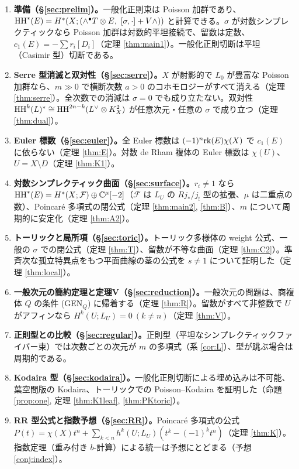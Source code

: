 \begin{enumerate}
\item[(1)] \textbf{準備（\S\ref{sec:prelim}）。}一般化正則束は Poisson 加群であり、$\HH^*(E)=H^*(X;(\wedge^\bullet T\otimes E,\ [\sigma,\cdot]+V\wedge))$ と計算できる。$\sigma$ が対数シンプレクティックなら Poisson 加群は対数的平坦接続で、留数は定数、$c_1(E)=-\sum r_i[D_i]$（定理 \ref{thm:main1}）。一般化正則切断は平坦（Casimir 型）切断である。
\item[(2)] \textbf{Serre 型消滅と双対性（\S\ref{sec:serre}）。}$X$ が射影的で $L_0$ が豊富な Poisson 加群なら、$m\gg0$ で横断次数 $a>0$ のコホモロジーがすべて消える（定理 \ref{thm:serre}）。全次数での消滅は $\sigma=0$ でも成り立たない。双対性 $\mathrm{HH}^k(L)^*\cong\mathrm{HH}^{2n-k}(L^\vee\otimes K_X^2)$ が任意次元・任意の $\sigma$ で成り立つ（定理 \ref{thm:dual}）。
\item[(3)] \textbf{Euler 標数（\S\ref{sec:euler}）。}全 Euler 標数は $(-1)^n\mathrm{rk}(E)\chi(X)$ で $c_1(E)$ に依らない（定理 \ref{thm:E}）。対数 de Rham 複体の Euler 標数は $\chi(U)$、$U=X\setminus D$（定理 \ref{thm:K1}）。
\item[(4)] \textbf{対数シンプレクティック曲面（\S\ref{sec:surface}）。}$r_i\neq1$ なら $\mathrm{HH}^*(E)=H^*(X;\mathcal F)\oplus\mathbb C^\mu[-2]$（$\mathcal F$ は $L_U$ の $Rj_*$/$j_!$ 型の拡張、$\mu$ は二重点の数）、Poincar\'e 多項式の閉公式（定理 \ref{thm:main2}, \ref{thm:B}）、$m$ について周期的に安定化（定理 \ref{thm:A2}）。
\item[(5)] \textbf{トーリックと局所項（\S\ref{sec:toric}）。}トーリック多様体の weight 公式、一般の $\sigma$ での閉公式（定理 \ref{thm:T}）、留数が不等な曲面（定理 \ref{thm:C2}）。準斉次な孤立特異点をもつ平面曲線の茎の公式を $s\neq1$ について証明した（定理 \ref{thm:local}）。
\item[(6)] \textbf{一般次元の簡約定理と定理V（\S\ref{sec:reduction}）。}一般次元の問題は、商複体 $Q$ の条件 (GEN$_Q$) に帰着する（定理 \ref{thm:R}）。留数がすべて非整数で $U$ がアフィンなら $H^k(U;L_U)=0\ (k\ne n)$（定理 \ref{thm:V}）。
\item[(7)] \textbf{正則型との比較（\S\ref{sec:regular}）。}正則型（平坦なシンプレクティックファイバー束）では次数ごとの次元が $m$ の多項式（系 \ref{cor:L}）、型が跳ぶ場合は周期的である。
\item[(8)] \textbf{Kodaira 型（\S\ref{sec:kodaira}）。}一般化正則切断による埋め込みは不可能、葉空間版の Kodaira、トーリックでの Poisson--Kodaira を証明した（命題 \ref{prop:one}, 定理 \ref{thm:K1leaf}, \ref{thm:PKtoric}）。
\item[(9)] \textbf{RR 型公式と指数予想（\S\ref{sec:RR}）。}Poincar\'e 多項式の公式 $P(t)=\chi(X)t^n+\sum_{k<n}h^k(U;L_U)(t^k-(-1)^kt^n)$（定理 \ref{thm:K}）。指数定理（重み付き $b$-計算）による統一は予想にとどまる（予想 \ref{conj:index}）。
\end{enumerate}

